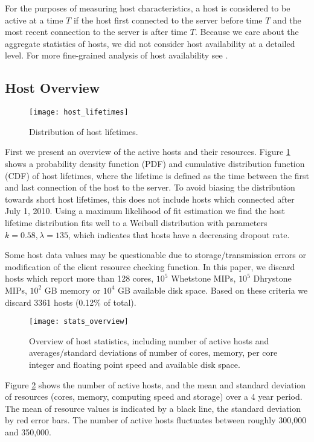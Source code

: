 \documentclass[conference]{IEEEtran}
\begin{document}
For the purposes of measuring host characteristics, a host is considered to be active at a time $T$ if the host first connected to the server before time $T$ and the most recent connection to the server is after time $T$.  Because we care about the aggregate statistics of hosts, we did not consider host availability at a detailed level.  For more fine-grained analysis of host availability see \cite{Javadi:2009p7323,Nurmi:2005p333}.

\subsection{Host Overview}
\label{sec-host-overview}

\begin{figure}[!t]
\centering
\texttt{[image: host\_lifetimes]}
\caption{Distribution of host lifetimes.}
\label{fig-host-lifetime}
\end{figure}

First we present an overview of the active hosts and their resources.  Figure \ref{fig-host-lifetime} shows a probability density function (PDF) and cumulative distribution function (CDF) of host lifetimes, where the lifetime is defined as the time between the first and last connection of the host to the server.  To avoid biasing the distribution towards short host lifetimes, this does not include hosts which connected after July 1, 2010.  Using a maximum likelihood of fit estimation we find the host lifetime distribution fits well to a Weibull distribution with parameters $k=0.58, \lambda=135$, which indicates that hosts have a decreasing dropout rate.

Some host data values may be questionable due to storage/transmission errors or modification of the client resource checking function.  In this paper, we discard hosts which report more than 128 cores, $10^5$ Whetstone MIPs, $10^5$ Dhrystone MIPs, $10^2$ GB memory or $10^4$ GB available disk space.  Based on these criteria we discard 3361 hosts (0.12\% of total).

\begin{figure}[!t]
\centering
\texttt{[image: stats\_overview]}
\caption{Overview of host statistics, including number of active hosts and averages/standard deviations of number of cores, memory, per core integer and floating point speed and available disk space.}
\label{fig-res-overview}
\end{figure}

Figure \ref{fig-res-overview} shows the number of active hosts, and the mean and standard deviation of resources (cores, memory, computing speed and storage) over a 4 year period.  The mean of resource values is indicated by a black line, the standard deviation by red error bars.  The number of active hosts fluctuates between roughly 300,000 and 350,000.
\end{document}
